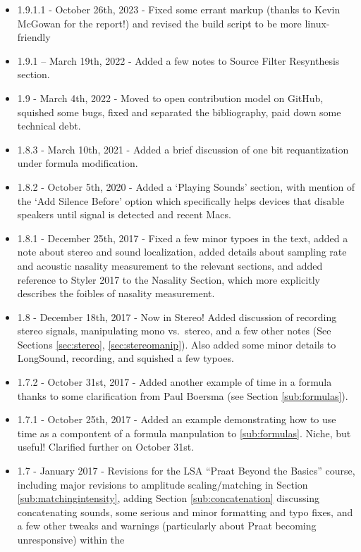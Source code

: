 \documentclass[11pt]{article}
\begin{document}
\begin{itemize}
\item
  1.9.1.1 - October 26th, 2023 - Fixed some errant markup (thanks to
  Kevin McGowan for the report!) and revised the build script to be more
  linux-friendly
\item
  1.9.1 -- March 19th, 2022 - Added a few notes to Source Filter
  Resynthesis section.
\item
  1.9 - March 4th, 2022 - Moved to open contribution model on GitHub,
  squished some bugs, fixed and separated the bibliography, paid down
  some technical debt.
\item
  1.8.3 - March 10th, 2021 - Added a brief discussion of one bit
  requantization under formula modification.
\item
  1.8.2 - October 5th, 2020 - Added a `Playing Sounds' section, with
  mention of the `Add Silence Before' option which specifically helps
  devices that disable speakers until signal is detected and recent
  Macs.
\item
  1.8.1 - December 25th, 2017 - Fixed a few minor typoes in the text,
  added a note about stereo and sound localization, added details about
  sampling rate and acoustic nasality measurement to the relevant
  sections, and added reference to Styler 2017 to the Nasality Section,
  which more explicitly describes the foibles of nasality measurement.
\item
  1.8 - December 18th, 2017 - Now in Stereo! Added discussion of
  recording stereo signals, manipulating mono vs.~stereo, and a few
  other notes (See Sections \ref{sec:stereo}, \ref{sec:stereomanip}).
  Also added some minor details to LongSound, recording, and squished a
  few typoes.
\item
  1.7.2 - October 31st, 2017 - Added another example of time in a
  formula thanks to some clarification from Paul Boersma (see Section
  \ref{sub:formulas}).
\item
  1.7.1 - October 25th, 2017 - Added an example demonstrating how to use
  time as a compontent of a formula manpulation to \ref{sub:formulas}.
  Niche, but useful! Clarified further on October 31st.
\item
  1.7 - January 2017 - Revisions for the LSA ``Praat Beyond the Basics''
  course, including major revisions to amplitude scaling/matching in
  Section \ref{sub:matchingintensity}, adding Section
  \ref{sub:concatenation} discussing concatenating sounds, some serious
  and minor formatting and typo fixes, and a few other tweaks and
  warnings (particularly about Praat becoming unresponsive) within the

\end{itemize}
\end{document}
